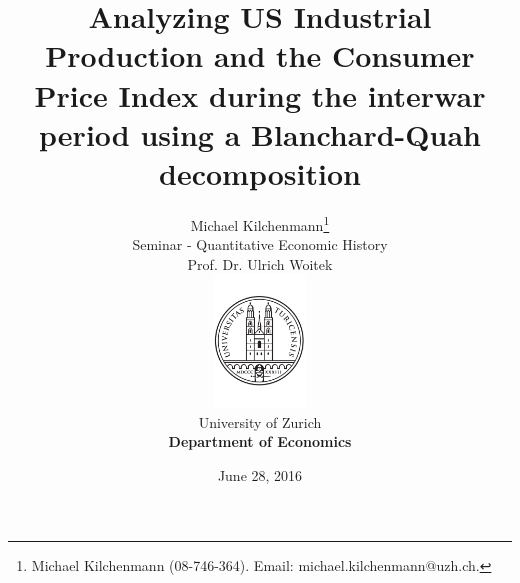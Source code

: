\title{\textbf{Analyzing US Industrial Production and the Consumer Price Index during the interwar period using a Blanchard-Quah decomposition\\}\vspace{10pt}}
\author{\vspace{17pt} \Large{Michael Kilchenmann}\thanks{Michael Kilchenmann (08-746-364). Email: michael.kilchenmann@uzh.ch.} \\ \vspace{17pt}
Seminar - Quantitative Economic History\\ \vspace{12pt}
Prof. Dr. Ulrich Woitek\\ \vspace{12pt}
\includegraphics[width=2.5cm]{images/unilogo-clean3.pdf} \\ \vspace{4pt}
University of Zurich \\ \vspace{4pt}
\textbf{Department of Economics} \\ \vspace{4pt}
}

\date{June 28, 2016}

\maketitle
\thispagestyle{empty}



\clearpage
